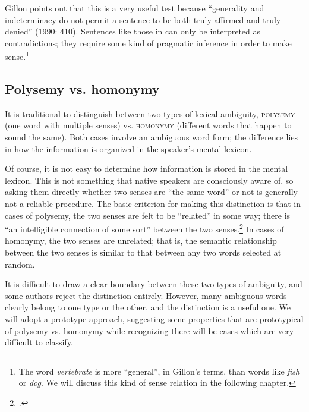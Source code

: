 Gillon points out that this is a very useful test because “generality and indeterminacy do not permit a sentence to be both truly affirmed and truly denied” (1990: 410). Sentences like those in  can only be interpreted as contradictions; they require some kind of pragmatic inference in order to make sense.\footnote{The word \textit{vertebrate} is more “general”, in Gillon’s terms, than words like \textit{fish} or \textit{dog}. We will discuss this kind of sense relation in the following chapter.}


\ea \label{ex:5.13}
                       \z
\z

\subsection{Polysemy vs. homonymy}\label{sec:5.3.3}

It is traditional to distinguish between two types of lexical ambiguity, \textsc{polysemy} (one word with multiple senses) vs. \textsc{homonymy} (different words that happen to sound the same). Both cases involve an ambiguous word form; the difference lies in how the information is organized in the speaker’s mental lexicon.


Of course, it is not easy to determine how information is stored in the mental lexicon. This is not something that native speakers are consciously aware of, so asking them directly whether two senses are “the same word” or not is generally not a reliable procedure. The basic criterion for making this distinction is that in cases of polysemy, the two senses are felt to be “related” in some way; there is “an intelligible connection of some sort” between the two senses.\footnote{\citet[109]{Cruse2000}.} In cases of homonymy, the two senses are unrelated; that is, the semantic relationship between the two senses is similar to that between any two words selected at random.



It is difficult to draw a clear boundary between these two types of ambiguity, and some authors reject the distinction entirely. However, many ambiguous words clearly belong to one type or the other, and the distinction is a useful one. We will adopt a prototype approach, suggesting some properties that are prototypical of polysemy vs. homonymy while recognizing there will be cases which are very difficult to classify.


